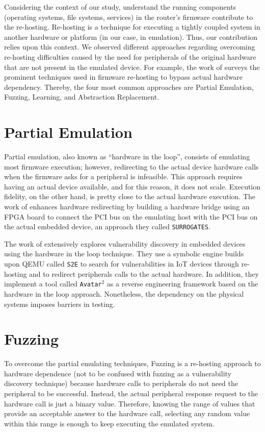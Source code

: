 Considering the context of our study, understand the running components (operating systems, file systems, services) in the router's firmware contribute to the re-hosting.  Re-hosting is a technique for executing a tightly coupled system in another hardware or platform (in our case, in emulation).  Thus, our contribution relies upon this context.  We observed different approaches regarding overcoming re-hosting difficulties caused by the need for peripherals of the original hardware that are not present in the emulated device. For example, the work of \cite{firmware-challenges} surveys the prominent techniques used in firmware re-hosting to bypass actual hardware dependency. Thereby, the four most common approaches are Partial Emulation, Fuzzing, Learning, and Abstraction Replacement.

\section{Partial Emulation}

Partial emulation, also known as ``hardware in the loop'', consists of emulating most firmware execution; however, redirecting to the actual device hardware calls when the firmware asks for a peripheral is infeasible. This approach requires having an actual device available, and for this reason, it does not scale. Execution fidelity, on the other hand, is pretty close to the actual hardware execution. The work of \cite{surrogates} enhances hardware redirecting by building a hardware bridge using an FPGA board to connect the PCI bus on the emulating host with the PCI bus on the actual embedded device, an approach they called {\tt SURROGATES}.

The work of \cite{avatar2} extensively explores vulnerability discovery in embedded devices using the hardware in the loop technique. They use a symbolic engine builds upon QEMU called {\tt S2E} to search for vulnerabilities in IoT devices through re-hosting and to redirect peripherals calls to the actual hardware. In addition, they implement a tool called {\tt Avatar$^2$} as a reverse engineering framework based on the hardware in the loop approach.  Nonetheless, the dependency on the physical systems imposes barriers in testing.

\section{Fuzzing}

To overcome the partial emulating techniques, Fuzzing is a re-hosting approach to hardware dependence (not to be confused with fuzzing as a vulnerability discovery technique) because hardware calls to peripherals do not need the peripheral to be successful. Instead, the actual peripheral response request to the hardware call is just a binary value. Therefore, knowing the range of values that provide an acceptable answer to the hardware call, selecting any random value within this range is enough to keep executing the emulated system.

